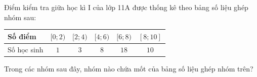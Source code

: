 \begin{ex}
Điểm kiểm tra giữa học kì I của lớp 11A được thống kê theo bảng số liệu ghép nhóm sau:
\begin{center}\begin{tabular}{|l|c|c|c|c|c|}\hline
Số điểm & $[0;2)$ & $[2;4)$ & $[4;6)$ & $[6;8)$ & $[8;10]$\\\hline
Số học sinh & $1$ & $3$ & $8$ & $18$ & $10$\\\hline
\end{tabular}\end{center}
Trong các nhóm sau đây, nhóm nào chứa mốt của bảng số liệu ghép nhóm trên?
\choice{$[8;10]$}{$[4;6)$}{\True $[6;8)$}{$[2;4)$}
\loigiai{Nhóm có tần số lớn nhất ($18$) là $[6;8)$.}
\end{ex}
